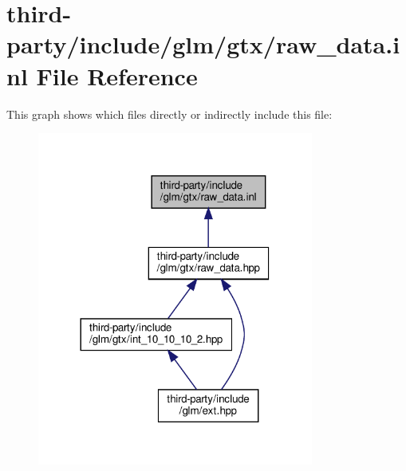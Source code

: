 \hypertarget{raw__data_8inl}{}\section{third-\/party/include/glm/gtx/raw\+\_\+data.inl File Reference}
\label{raw__data_8inl}
This graph shows which files directly or indirectly include this file\+:
\nopagebreak
\begin{figure}[H]
\begin{center}
\leavevmode
\includegraphics[width=257pt]{raw__data_8inl__dep__incl}
\end{center}
\end{figure}

